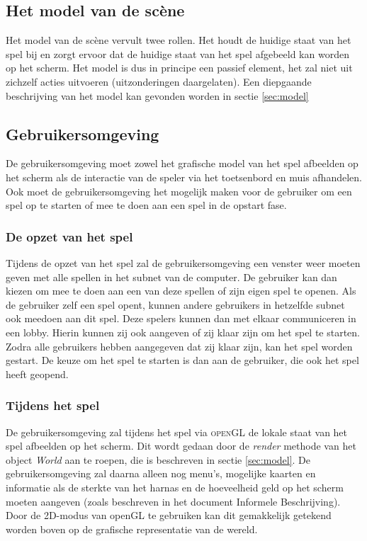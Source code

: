 \documentclass[a4paper,11pt]{article}
\begin{document}
    \subsection{Het model van de sc\`ene}
    Het model van de sc\`ene vervult twee rollen. Het houdt de huidige staat van het spel bij en zorgt ervoor dat de huidige staat van het spel afgebeeld kan worden op het scherm. Het model is dus in principe een passief element, het zal niet uit zichzelf acties uitvoeren (uitzonderingen daargelaten). Een diepgaande beschrijving van het model kan gevonden worden in sectie \ref{sec:model}

    \subsection{Gebruikersomgeving}
   	De gebruikersomgeving moet zowel het grafische model van het spel afbeelden op het scherm als de interactie van de speler via het toetsenbord en muis afhandelen. Ook moet de gebruikersomgeving het mogelijk maken voor de gebruiker om een spel op te starten of mee te doen aan een spel in de opstart fase.

    \subsubsection{De opzet van het spel}
    Tijdens de opzet van het spel zal de gebruikersomgeving een venster weer moeten geven met alle spellen in het subnet van de computer. De gebruiker kan dan kiezen om mee te doen aan een van deze spellen of zijn eigen spel te openen. Als de gebruiker zelf een spel opent, kunnen andere gebruikers in hetzelfde subnet ook meedoen aan dit spel. Deze spelers kunnen dan met elkaar communiceren in een lobby. Hierin kunnen zij ook aangeven of zij klaar zijn om het spel te starten. Zodra alle gebruikers hebben aangegeven dat zij klaar zijn, kan het spel worden gestart. De keuze om het spel te starten is dan aan de gebruiker, die ook het spel heeft geopend.

    \subsubsection{Tijdens het spel}
    De gebruikersomgeving zal tijdens het spel via \textsc{openGL} de lokale staat van het spel afbeelden op het scherm. Dit wordt gedaan door de \emph{render} methode van het object \emph{World} aan te roepen, die is beschreven in sectie \ref{sec:model}. De gebruikersomgeving zal daarna alleen nog menu's, mogelijke kaarten en informatie als de sterkte van het harnas en de hoeveelheid geld op het scherm moeten aangeven (zoals beschreven in het document Informele Beschrijving). Door de 2D-modus van openGL te gebruiken kan dit gemakkelijk getekend worden boven op de grafische representatie van de wereld.
\end{document}
